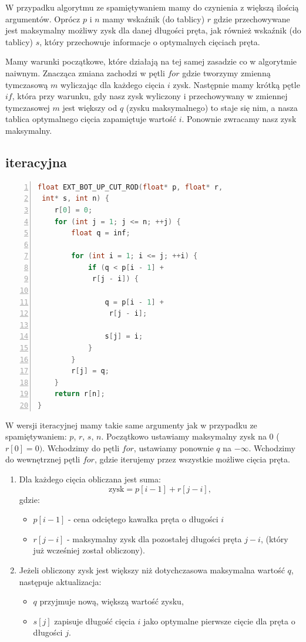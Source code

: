 \documentclass{article}
\begin{document}
\large{W przypadku algorytmu ze spamiętywaniem mamy do czynienia z większą ilością argumentów. Oprócz $p$ i $n$ mamy wskaźnik (do tablicy) $r$ gdzie przechowywane jest maksymalny możliwy zysk dla danej długości pręta, jak również wskaźnik (do tablicy) $s$, który przechowuje informacje o optymalnych cięciach pręta.}

\large{Mamy warunki początkowe, które działają na tej samej zasadzie co w algorytmie naiwnym. Znacząca zmiana zachodzi w pętli $for$ gdzie tworzymy zmienną tymczasową $m$ wyliczając dla każdego cięcia $i$ zysk. Następnie mamy krótką pętle $if$, która przy warunku, gdy nasz zysk wyliczony i przechowywany w zmiennej tymczasowej $m$ jest większy od $q$ (zysku maksymalnego) to staje się nim, a nasza tablica optymalnego cięcia zapamiętuje wartość $i$. Ponownie zwracamy nasz zysk maksymalny.}

\subsection{iteracyjna}

\begin{lstlisting}[language=C++, caption={Kod funkcji rozcinania pręta w wersji ze spamiętywaniem}, numbers=left, frame=single, xleftmargin=20pt]
float EXT_BOT_UP_CUT_ROD(float* p, float* r,
 int* s, int n) {
	r[0] = 0;
	for (int j = 1; j <= n; ++j) {
		float q = inf;
		
		for (int i = 1; i <= j; ++i) {
			if (q < p[i - 1] + 
			 r[j - i]) {
			 	
				q = p[i - 1] + 
				 r[j - i];
				 
				s[j] = i;
			}
		}
		r[j] = q;
	}
	return r[n];
}
\end{lstlisting}

\large{W wersji iteracyjnej mamy takie same argumenty jak w przypadku ze spamiętywaniem: $p$, $r$, $s$, $n$. Początkowo ustawiamy maksymalny zysk na $0$ ($r[0] = 0)$. Wchodzimy do pętli $for$, ustawiamy ponownie $q$ na \(-\infty\). Wchodzimy do wewnętrznej pętli $for$, gdzie iterujemy przez wszystkie możliwe cięcia pręta.}

\begin{enumerate}
	\item Dla każdego cięcia obliczana jest suma:
	\[
	\text{zysk} = p[i - 1] + r[j - i],
	\]
	gdzie:
	\begin{itemize}
		\item $p[i - 1]$ - cena odciętego kawałka pręta o długości $i$ 
		\item $r[j - i]$ - maksymalny zysk dla pozostałej długości pręta $j - i$, (który już wcześniej został obliczony).
	\end{itemize}
	\item Jeżeli obliczony zysk jest większy niż dotychczasowa maksymalna wartość $q$, następuje aktualizacja:
	\begin{itemize}
		\item $q$ przyjmuje nową, większą wartość zysku,
		\item $s[j]$ zapisuje długość cięcia $i$ jako optymalne pierwsze cięcie dla pręta o długości $j$.
	\end{itemize}
\end{enumerate}
\end{document}

